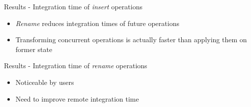 \documentclass[10pt]{beamer}
\begin{document}
\begin{frame}{Results - Integration time of \emph{insert} operations}
  \vspace{-1\baselineskip}
  \begin{itemize}
    \item<2-> \emph{Rename} reduces integration times of future operations
    \item<3> Transforming concurrent operations is actually faster than applying them on former state
  \end{itemize}

\end{frame}

\begin{frame}{Results - Integration time of \emph{rename} operations}
  \begin{table}[!ht]
      \centering
      \caption{Integration time of rename operations}
  \end{table}

  \begin{itemize}
    \item<2-> Noticeable by users
    \item<3> Need to improve remote integration time
  \end{itemize}
\end{frame}
\end{document}
